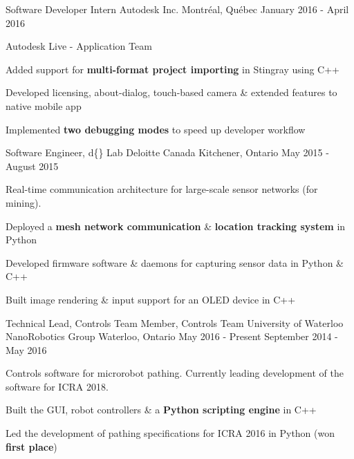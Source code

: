 \begin{cventries}

\cventry
{Software Developer Intern}
{Autodesk Inc.}
{Montréal, Québec}
{January 2016 - April 2016}
{ %
Autodesk Live - Application Team
\begin{cvitems}
\item[]
\item {Added support for \textbf{multi-format project importing} in Stingray using C++}
\item {Developed licensing, about-dialog, touch-based camera \& extended features to native mobile app}
\item {Implemented \textbf{two debugging modes} to speed up developer workflow}
\end{cvitems}
}


\cventry
{Software Engineer, d\{\} Lab}
{Deloitte Canada} %
{Kitchener, Ontario} %
{May 2015 - August 2015} %
{
Real-time communication architecture for large-scale sensor networks (for mining).
\begin{cvitems}
\item[]
\item {Deployed a \textbf{mesh network communication} \& \textbf{location tracking system} in Python}
\item {Developed firmware software \& daemons for capturing sensor data in Python \& C++}
\item {Built image rendering \& input support for an OLED device in C++}
\end{cvitems}
}


\cventry
{Technical Lead, Controls Team \newline {\vspace{-.75mm}}
Member, Controls Team}
{University of Waterloo NanoRobotics Group}
{Waterloo, Ontario}
{May 2016 - Present \newline {\vspace{-1mm}}
September 2014 - May 2016} %
{ %
Controls software for microrobot pathing. Currently leading development of the software for ICRA 2018.
\begin{cvitems}
\item[]
\item {Built the GUI, robot controllers \& a \textbf{Python scripting engine} in C++}
\item {Led the development of pathing specifications for ICRA 2016 in Python (won \textbf{first place})}
\end{cvitems}
}

\end{cventries}
